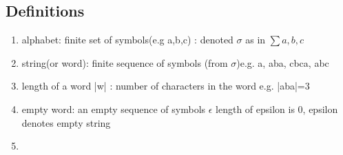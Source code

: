 \documentclass[11pt]{amsart}
\begin{document}
\subsection{Definitions}
\begin{enumerate}
  \item alphabet: finite set of symbols(e.g {a,b,c}) : denoted $\sigma$ as in
    $\sum{a,b,c}$
  \item string(or word): finite sequence of symbols (from $\sigma$)e.g. a, aba,
    cbca, abc
  \item length of a word |w| : number of characters in the word  e.g. |aba|=3
  \item empty word: an empty sequence of symbols $\epsilon$ length of epsilon
    is 0, epsilon denotes empty string
  \item
\end{enumerate}
\end{document}
